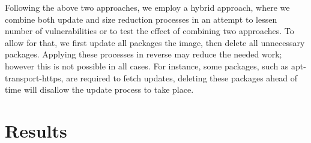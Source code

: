 \documentclass[a4paper,num-refs]{oup-contemporary}
\begin{document}
Following the above two approaches, we employ a hybrid approach, where
we combine both update and size reduction processes in an attempt to
lessen number of vulnerabilities or to test the effect of
combining two approaches. To allow for that, we first update all packages
the image, then delete all unnecessary packages. Applying these processes in reverse
may reduce the needed work; however this is not possible in all cases. For instance,
some packages, such as apt-transport-https, are required to fetch updates, deleting these packages
ahead of time will disallow the update process to take place.
%
\section{Results}
\end{document}
